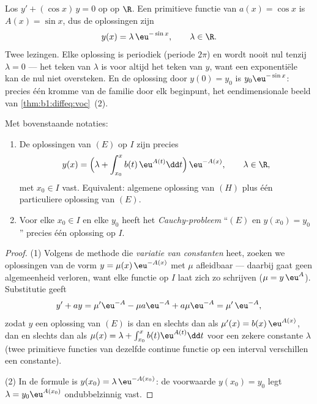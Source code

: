 \begin{example}\label{ex:b1:diffeq:varcoeff}
Los $y' + (\cos x)\,y = 0$ op op $\R$. Een primitieve functie van $a(x)
= \cos x$ is $A(x) = \sin x$, dus de oplossingen zijn
\[
y(x) = \lambda\,\eu^{-\sin x}, \qquad \lambda \in \R .
\]
Twee lezingen. Elke oplossing is periodiek (periode $2\pi$) en wordt
nooit nul tenzij $\lambda = 0$ --- het teken van $\lambda$ is voor
altijd het teken van $y$, want een exponentiële kan de nul niet
oversteken. En de oplossing door $y(0) = y_0$ is $y_0\eu^{-\sin x}$:
precies één kromme van de familie door elk beginpunt, het
eendimensionale beeld van \cref{thm:b1:diffeq:voc}~(2).
\end{example}

\begin{theorem}\label{thm:b1:diffeq:voc}
Met bovenstaande notaties:
\begin{enumerate}
  \item De oplossingen van $(E)$ op $I$ zijn precies
        \[
        y(x) = \Bigl(\lambda + \int_{x_0}^{x} b(t)\, \eu^{A(t)} \dd t
        \Bigr)\, \eu^{-A(x)},
        \qquad \lambda \in \R,
        \]
        met $x_0 \in I$ vast. Equivalent: algemene oplossing van $(H)$
        plus één particuliere oplossing van $(E)$.
  \item Voor elke $x_0 \in I$ en elke $y_0$ heeft het
        \emph{Cauchy-probleem} ``$(E)$ en
        $y(x_0) = y_0$'' precies één oplossing op $I$.
\end{enumerate}
\end{theorem}

\begin{proof}
(1) Volgens de methode die \emph{variatie van
constanten} heet, zoeken we oplossingen
van de vorm $y = \mu(x)\, \eu^{-A(x)}$ met $\mu$ afleidbaar --- daarbij
gaat geen algemeenheid verloren, want elke functie op $I$ laat zich zo
schrijven ($\mu = y\,\eu^{A}$). Substitutie geeft
\[
y' + ay = \mu' \eu^{-A} - \mu a \eu^{-A} + a\mu\eu^{-A}
= \mu'\, \eu^{-A},
\]
zodat $y$ een oplossing van $(E)$ is dan en slechts dan als $\mu'(x) =
b(x)\,\eu^{A(x)}$, dan en slechts dan als $\mu(x) = \lambda +
\int_{x_0}^x b(t)\eu^{A(t)}\dd t$ voor een zekere constante $\lambda$
(twee primitieve functies van dezelfde continue functie op een interval
verschillen een constante).

(2) In de formule is $y(x_0) = \lambda\,\eu^{-A(x_0)}$: de voorwaarde
$y(x_0) = y_0$ legt $\lambda = y_0 \eu^{A(x_0)}$ ondubbelzinnig vast.
\end{proof}

